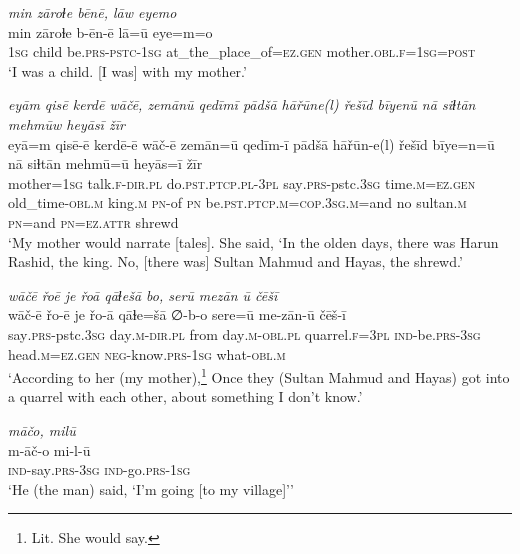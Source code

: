 \ea \label{ŽH.1}
\textit{min zāroɫe bēnē, lāw eyemo} \\ 
\gll min zāroɫe b-ēn-ē lā=ū eye=m=o \\ 
 \textsc{1sg} child be\textsc{.prs}\textsc{-pstc}\textsc{-1sg} at\_the\_place\_of\textsc{=ez}\textsc{.gen} mother\textsc{.obl}\textsc{\textsc{.f}}\textsc{=1sg}\textsc{=\textsc{post}} \\ 
\glt `I was a child. [I was] with my mother.'
\z 
 
\ea \label{ŽH.2}
\textit{eyām qisē kerdē wāčē, zemānū qedīmī pādšā hāřūne(l) řešīd bīyenū nā siɫtān mehmūw heyāsī žīr} \\ 
\gll eyā=m qisē-ē kerdē-ē wāč-ē zemān=ū qedīm-ī pādšā hāřūn-e(l) řešīd bīye=n=ū nā siɫtān mehmū=ū heyās=ī žīr \\ 
 mother\textsc{=1sg} talk\textsc{\textsc{.f}}\textsc{-dir}\textsc{.pl} do\textsc{.pst}\textsc{.ptcp}\textsc{.pl}\textsc{-3pl} say\textsc{.prs-}pstc\textsc{.3sg} time\textsc{.m}\textsc{=ez}\textsc{.gen} old\_time\textsc{-obl}\textsc{.m} king\textsc{.m} \textsc{pn}-of \textsc{pn} be\textsc{.pst}\textsc{.ptcp}\textsc{.m}\textsc{=cop}\textsc{.3sg}\textsc{.m}=and no sultan\textsc{.m} \textsc{pn}=and \textsc{pn}\textsc{=ez}.\textsc{attr} shrewd \\ 
\glt `My mother would narrate [tales]. She said, ‘In the olden days, there was Harun Rashid, the king. No, [there was] Sultan Mahmud and Hayas, the shrewd.'
\z 
 
\ea \label{ŽH.3}
\textit{wāčē řoē je řoā qāɫešā bo, serū mezān ū čēšī} \\ 
\gll wāč-ē řo-ē je řo-ā qāɫe=šā ∅-b-o sere=ū me-zān-ū čēš-ī \\ 
 say\textsc{.prs-}pstc\textsc{.3sg} day\textsc{.m}\textsc{-dir}\textsc{.pl} from day\textsc{.m}\textsc{-obl}\textsc{.pl} quarrel\textsc{\textsc{.f}}\textsc{=3pl} \textsc{ind-}be\textsc{.prs}\textsc{-3sg} head\textsc{.m}\textsc{=ez}\textsc{.gen} \textsc{neg-}know\textsc{.prs}\textsc{-1sg} what\textsc{-obl}\textsc{.m} \\ 
\glt `According to her (my mother),\footnote{Lit. She would say.}  Once they (Sultan Mahmud and Hayas) got into a quarrel with each other, about something I don’t know.'
\z 
 
\ea \label{ŽH.10}
\textit{māčo, milū} \\ 
\gll m-āč-o mi-l-ū \\ 
 \textsc{ind-}say\textsc{.prs}\textsc{-3sg} \textsc{ind-}go\textsc{.prs}\textsc{-1sg} \\ 
\glt `He (the man) said, ‘I’m going [to my village]’'
\z 
 
